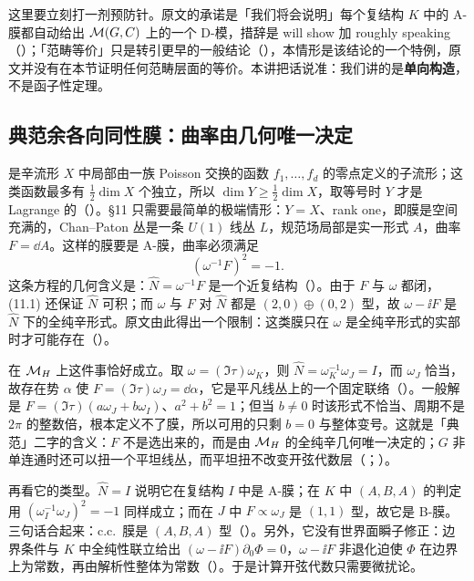 这里要立刻打一剂预防针。原文的承诺是「我们将会说明」每个复结构 $K$ 中的 A-膜都自动给出 $\mathcal{M}(G,C)$ 上的一个 D-模，措辞是 will show 加 roughly speaking（）；「范畴等价」只是转引更早的一般结论（），本情形是该结论的一个特例，原文并没有在本节证明任何范畴层面的等价。本讲把话说准：我们讲的是\textbf{单向构造}，不是函子性定理。

\subsection{典范余各向同性膜：曲率由几何唯一决定}

是辛流形 $X$ 中局部由一族 Poisson 交换的函数 $f_1,\dots,f_d$ 的零点定义的子流形；这类函数最多有 $\tfrac12\dim X$ 个独立，所以 $\dim Y\ge\tfrac12\dim X$，取等号时 $Y$ 才是 Lagrange 的（）。\S11 只需要最简单的极端情形：$Y=X$、rank one，即膜是空间充满的，Chan--Paton 丛是一条 $U(1)$ 线丛 $L$，规范场局部是实一形式 $A$，曲率 $F=\dd A$。这样的膜要是 A-膜，曲率必须满足
\begin{equation}
(\omega^{-1}F)^2=-1 .
\label{eq:cc-condition}
\end{equation}
这条方程的几何含义是：$\hat N=\omega^{-1}F$ 是一个近复结构（）。由于 $F$ 与 $\omega$ 都闭，(11.1) 还保证 $\hat N$ 可积；而 $\omega$ 与 $F$ 对 $\hat N$ 都是 $(2,0)\oplus(0,2)$ 型，故 $\omega-\ii F$ 是 $\hat N$ 下的全纯辛形式。原文由此得出一个限制：这类膜只在 $\omega$ 是全纯辛形式的实部时才可能存在（）。

在 $\mathcal{M}_{H}$ 上这件事恰好成立。取 $\omega=(\Im\tau)\omega_K$，则 $\hat N=\omega_K^{-1}\omega_J=I$，而 $\omega_J$ 恰当，故存在势 $\alpha$ 使 $F=(\Im\tau)\omega_J=\dd\alpha$，它是平凡线丛上的一个固定联络（）。一般解是 $F=(\Im\tau)(a\omega_J+b\omega_I)$、$a^2+b^2=1$；但当 $b\neq0$ 时该形式不恰当、周期不是 $2\pi$ 的整数倍，根本定义不了膜，所以可用的只剩 $b=0$ 与整体变号。这就是「典范」二字的含义：$F$ 不是选出来的，而是由 $\mathcal{M}_{H}$ 的全纯辛几何唯一决定的；$G$ 非单连通时还可以扭一个平坦线丛，而平坦扭不改变开弦代数层（；）。

再看它的类型。$\hat N=I$ 说明它在复结构 $I$ 中是 A-膜；在 $K$ 中 $(A,B,A)$ 的判定用 $(\omega_I^{-1}\omega_J)^2=-1$ 同样成立；而在 $J$ 中 $F\propto\omega_J$ 是 $(1,1)$ 型，故它是 B-膜。三句话合起来：c.c.\ 膜是 $(A,B,A)$ 型（）。另外，它没有世界面瞬子修正：边界条件与 $K$ 中全纯性联立给出 $(\omega-\ii F)\partial_0\Phi=0$，$\omega-\ii F$ 非退化迫使 $\Phi$ 在边界上为常数，再由解析性整体为常数（）。于是计算开弦代数只需要微扰论。

